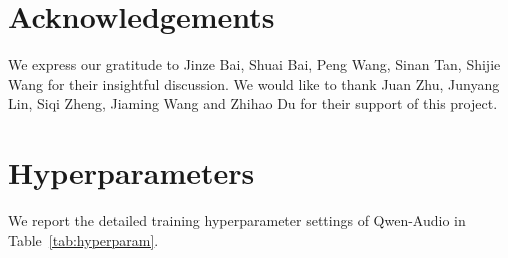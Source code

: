 \documentclass{article}
\begin{document}
\section{Acknowledgements}
We express our gratitude to Jinze Bai, Shuai Bai, Peng Wang, Sinan Tan, Shijie Wang for their insightful discussion. We would like to thank Juan Zhu, Junyang Lin, Siqi Zheng, Jiaming Wang and Zhihao Du for their support of this project.


 



\clearpage
\newpage

\appendix

\section{Hyperparameters}
\label{appendix:hyperparam}
We report the detailed training hyperparameter settings of Qwen-Audio in Table~\ref{tab:hyperparam}.
\end{document}
